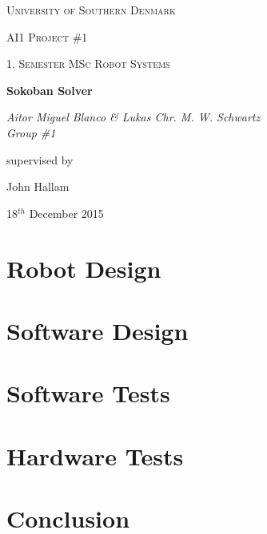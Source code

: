 \documentclass[12pt,a4paper]{article}
\begin{document}
\begin{titlepage}
	\centering
	\vfill
	{\scshape\LARGE University of Southern Denmark\par}
	\vspace{1cm}
	{\scshape\Large AI1 Project \#1\par}
	{\scshape\large 1. Semester MSc Robot Systems\par}
	\vspace{1.5cm}
	{\huge\bfseries Sokoban Solver\par}
	\vspace{2cm}
	{\Large\itshape Aitor Miguel Blanco \& Lukas Chr. M. W. Schwartz \\ Group \#1 \par}
	\vfill
	supervised by\par
	John Hallam

	\vspace{2cm}

	{\large 18$^{th}$ December 2015 \par}
\end{titlepage}

\pagebreak

\tableofcontents

\pagebreak

\listoffigures

\listoftables

\pagebreak



\pagebreak
\section{Robot Design}






\pagebreak
\section{Software Design}








\pagebreak
\section{Software Tests}


\pagebreak
\section{Hardware Tests}


\pagebreak
\section{Conclusion}

\end{document}
